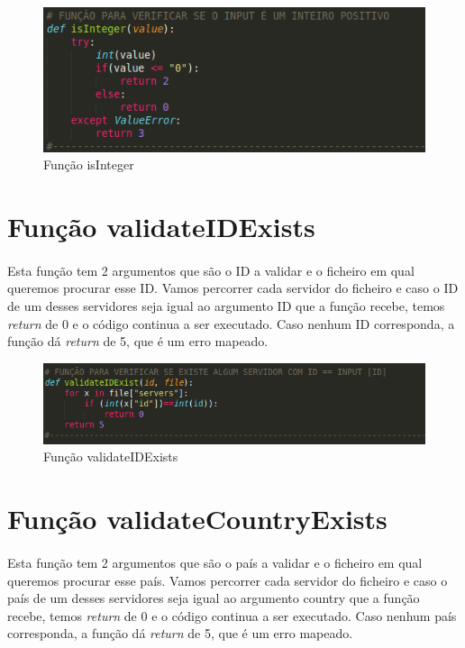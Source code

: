 \documentclass{report}
\begin{document}
\begin{figure}[H]
\centering
\includegraphics[width=0.8\linewidth]{integer.png}
\caption{Função isInteger}
\label{Integer}
\end{figure}


\section{Função validateIDExists }
\label{sec:valID}
\paragraph{}
Esta função tem 2 argumentos que são o ID a validar e o ficheiro em qual queremos procurar esse ID.
Vamos percorrer cada servidor do ficheiro e caso o ID de um desses servidores seja igual ao argumento ID que a função recebe, temos \textit{return} de 0 e o código continua a ser executado. \newline
Caso nenhum ID corresponda, a função dá \textit{return} de 5, que é um erro mapeado.

\begin{figure}[H]
\centering
\includegraphics[width=1.1\linewidth]{valID.png}
\caption{Função validateIDExists}
\label{ID}
\end{figure}


\section{Função validateCountryExists }
\label{sec:valCountry}
\paragraph{}
Esta função tem 2 argumentos que são o país a validar e o ficheiro em qual queremos procurar esse país.
Vamos percorrer cada servidor do ficheiro e caso o país de um desses servidores seja igual ao argumento country que a função recebe, temos \textit{return} de 0 e o código continua a ser executado. \newline
Caso nenhum país corresponda, a função dá \textit{return} de 5, que é um erro mapeado.
\end{document}
